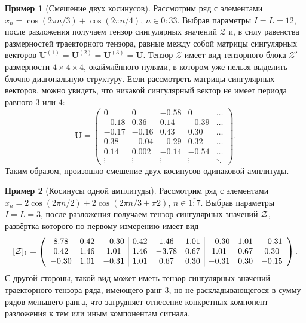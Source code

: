 \documentclass[specialist,
    substylefile = spbu_report.rtx,
    subf,href,colorlinks=true, 12pt]{disser}
\theoremstyle{plain}
\theoremstyle{definition}
\newtheorem{example}{Пример}[section]
\theoremstyle{remark}
\begin{document}
    \begin{example}[Смешение двух косинусов]
        Рассмотрим ряд с элементами $x_n=\cos(2\pi n/3) + \cos(2\pi n/4)$, $n\in\overline{0:33}$.
        Выбрав параметры $I=L=12$, после разложения получаем тензор сингулярных значений $\mathcal{Z}$ и, в силу равенства размерностей
        траекторного тензора, равные между собой матрицы сингулярных векторов $\mathbf{U}^{(1)}=\mathbf{U}^{(2)}=\mathbf{U}^{(3)}=\mathbf{U}$.
        Тензор $\mathcal{Z}$ имеет вид тензорного блока $\mathcal{Z}'$ размерности $4\times 4\times 4$, окаймлённого нулями, в
        котором уже нельзя выделить блочно-диагональную структуру.
        Если рассмотреть матрицы сингулярных векторов, можно увидеть, что никакой сингулярный вектор не имеет периода равного $3$ или $4$:
        \[
            \mathbf{U}=
            \begin{pmatrix}
                0      & 0      & -0.58  & 0      & \ldots \\
                -0.18  & 0.36   & 0.14   & -0.39  & \ldots \\
                -0.17  & -0.16  & 0.43   & 0.30   & \ldots \\
                0.38   & -0.04  & -0.29  & 0.32   & \ldots \\
                0.14   & 0.002  & -0.14  & -0.54  & \ldots \\
                \vdots & \vdots & \vdots & \vdots & \ddots
            \end{pmatrix}.
        \]
        Таким образом, произошло смешение двух косинусов одинаковой амплитуды.
    \end{example}

    \begin{example}[Косинусы одной амплитуды]
        Рассмотрим ряд с элементами $x_n = 2\cos(2\pi n / 2) + 2\cos(2\pi n / 3 + \pi 2)$,
        ${n \in \overline{1:7}}$.
        Выбрав параметры $I=L=3$, после разложения получаем тензор сингулярных значений $\mathcal{Z}$, развёртка которого
        по первому измерению имеет вид
        \[
            [\mathcal{Z}]_1 = \left(
            \begin{array}{ccc|ccc|ccc}
                8.78 & 0.42 & -0.30 & 0.42 &  1.46 & 1.01 & -0.30 & 1.01 & -0.31 \\
                0.42 & 1.46 & 1.01 & 1.46 & -3.78 & 0.67 & 1.01 & 0.67 & 0.30 \\
                -0.30 & 1.01 & -0.31 & 1.01 & 0.67 & 0.30 & -0.31 & 0.30 & -0.15 \\
            \end{array}
            \right).
        \]
        С другой стороны, такой вид может иметь тензор сингулярных значений траекторного тензора ряда, имеющего
        ранг 3, но не раскладывающегося в сумму рядов меньшего ранга, что
        затрудняет отнесение конкретных компонент разложения к тем или иным компонентам сигнала.
    \end{example}
\end{document}
